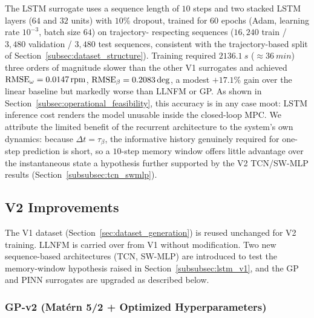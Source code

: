 The LSTM \cite{hochreiter_lstm_1997} surrogate uses a sequence length of $10$ steps and two stacked
LSTM layers ($64$ and $32$ units) with $10\%$ dropout, trained for $60$
epochs (Adam, learning rate $10^{-3}$, batch size $64$) on trajectory-
respecting sequences ($16{,}240$ train / $3{,}480$ validation / $3{,}480$
test sequences, consistent with the trajectory-based split of
Section~\ref{subsec:dataset_structure}). Training required $\SI{2136.1}{s}$
($\approx\SI{36}{min}$)  three orders of magnitude slower than the other
V1 surrogates  and achieved $\text{RMSE}_{\omega}=\SI{0.0147}{rpm}$,
$\text{RMSE}_{\beta}=0.2083\deg$, a modest $+17.1\%$ gain over the linear
baseline but markedly worse than LLNFM or GP. As shown in
Section~\ref{subsec:operational_feasibility}, this accuracy is in any case
moot: LSTM inference cost renders the model unusable inside the closed-loop
MPC. We attribute the limited benefit of the recurrent architecture to the
system's own dynamics: because $\Delta t = \tau_\beta$, the informative
history genuinely required for one-step prediction is short, so a
$10$-step memory window offers little advantage over the instantaneous
state  a hypothesis further supported by the V2 TCN/SW-MLP results
(Section~\ref{subsubsec:tcn_swmlp}).

\subsection{V2 Improvements}
\label{subsec:v2_models}

The V1 dataset (Section~\ref{sec:dataset_generation}) is reused unchanged
for V2 training. LLNFM is carried over from V1 without modification. Two
new sequence-based architectures (TCN, SW-MLP) are introduced to test the
memory-window hypothesis raised in Section~\ref{subsubsec:lstm_v1}, and the
GP and PINN surrogates are upgraded as described below.

\subsubsection{GP-v2 (Matérn 5/2 + Optimized Hyperparameters)}
\label{subsubsec:gp_v2}


